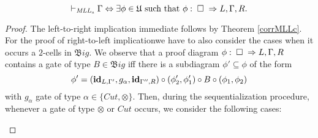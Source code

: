 \documentclass[a4paper]{article}
\begin{document}
\begin{theorem}\label{corrMllc}
$$\vdash_{\mathit{MLL_u}} \Gamma \Leftrightarrow \exists \phi \in \mathfrak{U} \mbox{ such that } \phi: \; \square \; \Rightarrow L,\Gamma, R.$$
\begin{proof}
The left-to-right implication immediate follows by Theorem \ref{corrMLLc}. For the proof of  right-to-left implicationwe have to also consider the cases when it occurs a $2$-cells in $\mathfrak Big$.
We observe that a proof diagram $\phi: \; \square \; \Rightarrow L,\Gamma, R$ contains a gate of type $B \in \mathfrak Big$ iff  there is a subdiagram $\phi'\subseteq \phi$ of the form
$$\phi'=(\textbf{id}_{L, \Gamma'}, g_\alpha, \textbf{id}_{\Gamma'', R})\circ (\phi_2' ,\phi_1') \circ B \circ (\phi_1 ,\phi_2)$$
with $g_\alpha$ gate of type $\alpha\in \{Cut, \otimes\}$.
Then, during the sequentialization procedure, whenever a gate of type $\otimes$ or $Cut$ occurs, we consider the following cases:
\begin{center}
\end{center}
\end{proof}
\end{theorem}
\end{document}

